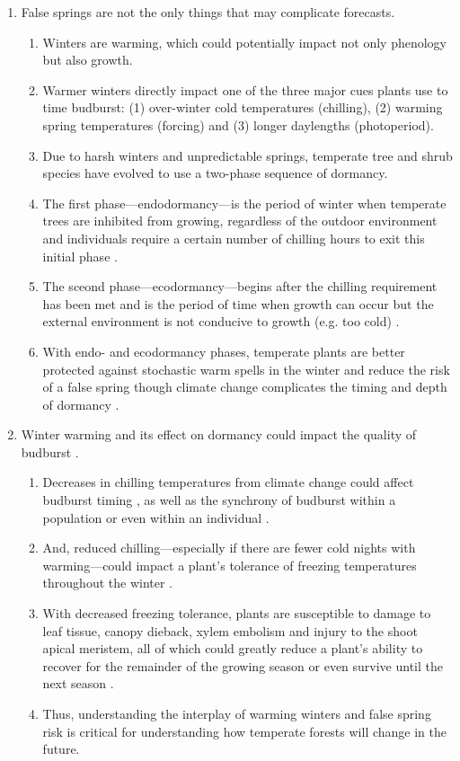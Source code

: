 \documentclass{article}\usepackage[]{graphicx}\usepackage[]{color}
\begin{document}
\begin{enumerate}
\item False springs are not the only things that may complicate forecasts.
  \begin{enumerate}
  \item Winters are warming, which could potentially impact not only phenology but also growth.
  \item Warmer winters directly impact one of the three major cues plants use to time budburst: (1) over-winter cold temperatures (chilling), (2) warming spring temperatures (forcing) and (3) longer daylengths (photoperiod). 
  \item Due to harsh winters and unpredictable springs, temperate tree and shrub species have evolved to use a two-phase sequence of dormancy.
  \item The first phase---endodormancy---is the period of winter when temperate trees are inhibited from growing, regardless of the outdoor environment and individuals require a certain number of chilling hours to exit this initial phase \citep{Charrier2011}.
  \item The sceond phase---ecodormancy---begins after the chilling requirement has been met and is the period of time when growth can occur but the external environment is not conducive to growth (e.g. too cold) \citep{Basler2012}. 
  \item With endo- and ecodormancy phases, temperate plants are better protected against stochastic warm spells in the winter and reduce the risk of a false spring \citep{Basler2014} though climate change complicates the timing and depth of dormancy \citep{Charrier2011}.
  \end{enumerate}

\item Winter warming and its effect on dormancy could impact the quality of budburst \citep{Cleland2007,Bonhomme2010}. 
  \begin{enumerate}
  \item Decreases in chilling temperatures from climate change could affect budburst timing \citep{Nanninga2017}, as well as the synchrony of budburst within a population or even within an individual \citep{Sanzperez2009}.
  \item And, reduced chilling---especially if there are fewer cold nights with warming---could impact a plant's tolerance of freezing temperatures throughout the winter \citep{Charrier2011}.
  \item With decreased freezing tolerance, plants are susceptible to damage to leaf tissue, canopy dieback, xylem embolism and injury to the shoot apical meristem, all of which could greatly reduce a plant's ability to recover for the remainder of the growing season or even survive until the next season \citep{Sakai1987,Gu2008}.
  \item Thus, understanding the interplay of warming winters and false spring risk is critical for understanding how temperate forests will change in the future. 
  \end{enumerate}
  

\end{enumerate}
\end{document}
